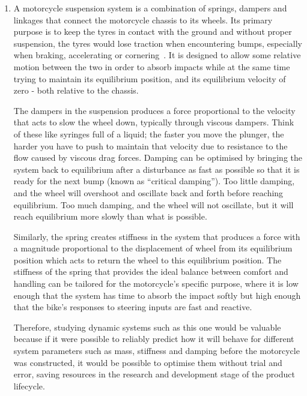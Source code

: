 \documentclass[12pt]{article}
\begin{document}
    \begin{enumerate}[listparindent=\parindent]
        \item A motorcycle suspension system is a combination of springs, dampers and linkages that connect the motorcycle chassis to its wheels.
        Its primary purpose is to keep the tyres in contact with the ground and without proper suspension, the tyres would lose traction when encountering bumps, especially when braking, accelerating or cornering~\cite{UTI2020MotorcycleSuspension}.
        It is designed to allow some relative motion between the two in order to absorb impacts while at the same time trying to maintain its equilibrium position, and its equilibrium velocity of zero - both relative to the chassis.

        The dampers in the suspension produces a force proportional to the velocity that acts to slow the wheel down, typically through viscous dampers.
        Think of these like syringes full of a liquid; the faster you move the plunger, the harder you have to push to maintain that velocity due to resistance to the flow caused by viscous drag forces.
        Damping can be optimised by bringing the system back to equilibrium after a disturbance as fast as possible so that it is ready for the next bump (known as ``critical damping'').
        Too little damping, and the wheel will overshoot and oscillate back and forth before reaching equilibrium.
        Too much damping, and the wheel will not oscillate, but it will reach equilibrium more slowly than what is possible.

        Similarly, the spring creates stiffness in the system that produces a force with a magnitude proportional to the displacement of wheel from its equilibrium position which acts to return the wheel to this equilibrium position.
        The stiffness of the spring that provides the ideal balance between comfort and handling can be tailored for the motorcycle's specific purpose, where it is low enough that the system has time to absorb the impact softly but high enough that the bike's responses to steering inputs are fast and reactive.

        Therefore, studying dynamic systems such as this one would be valuable because if it were possible to reliably predict how it will behave for different system parameters such as mass, stiffness and damping before the motorcycle was constructed, it would be possible to optimise them without trial and error, saving resources in the research and development stage of the product lifecycle.


\end{enumerate}
\end{document}
